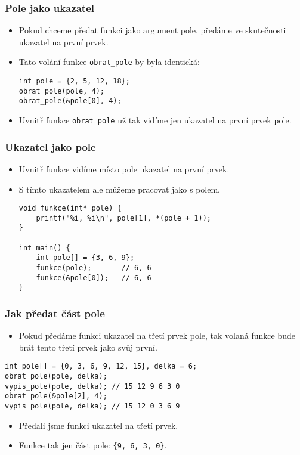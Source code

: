 \documentclass{beamer}
\newenvironment{itemizex}%
  {\large \begin{itemize}%
    \setlength{\itemsep}{8pt}%
    \setlength{\parskip}{8pt}}%
  {\end{itemize}}
\begin{document}
\begin{frame}[t,fragile]\frametitle{Pole jako ukazatel} 
    \begin{itemizex}
        \item Pokud chceme předat funkci jako argument pole, předáme ve skutečnosti ukazatel na první prvek.
        \item Tato volání funkce \texttt{obrat\_pole} by byla identická:
\begin{verbatim} 
int pole = {2, 5, 12, 18};
obrat_pole(pole, 4);
obrat_pole(&pole[0], 4);
\end{verbatim}
    \item Uvnitř funkce \texttt{obrat\_pole} už tak vidíme jen ukazatel na první prvek pole.
    \end{itemizex}
\end{frame}


\begin{frame}[t,fragile]\frametitle{Ukazatel jako pole} 
    \begin{itemizex}
        \item Uvnitř funkce vidíme místo pole ukazatel na první prvek.
        \item S tímto ukazatelem ale můžeme pracovat jako s polem.
        \begin{verbatim} 
void funkce(int* pole) {
    printf("%i, %i\n", pole[1], *(pole + 1));
}

int main() {
    int pole[] = {3, 6, 9};
    funkce(pole);       // 6, 6
    funkce(&pole[0]);   // 6, 6
}
        \end{verbatim}
    \end{itemizex}
\end{frame}


\begin{frame}[t,fragile]\frametitle{Jak předat část pole} 
\begin{itemizex}
    \item Pokud předáme funkci ukazatel na třetí prvek pole, tak volaná funkce bude brát tento třetí prvek jako svůj první.
\end{itemizex}

\begin{verbatim} 
int pole[] = {0, 3, 6, 9, 12, 15}, delka = 6;
obrat_pole(pole, delka);
vypis_pole(pole, delka); // 15 12 9 6 3 0
obrat_pole(&pole[2], 4);
vypis_pole(pole, delka); // 15 12 0 3 6 9 
\end{verbatim}

\begin{itemizex}
    \item Předali jsme funkci ukazatel na třetí prvek.
    \item Funkce tak  jen část pole: \texttt{\{9, 6, 3, 0\}}.
\end{itemizex}
\end{frame}
\end{document}
